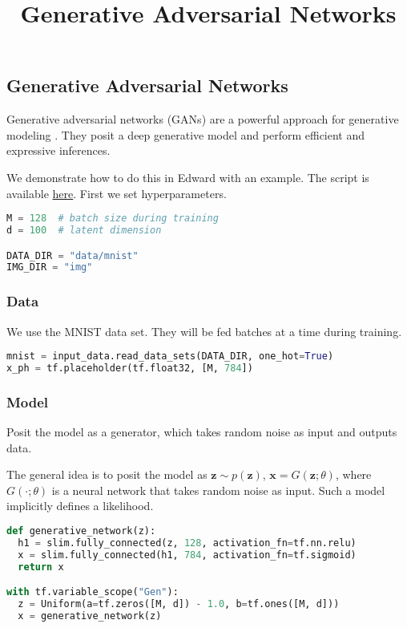 \title{Generative Adversarial Networks}

\subsection{Generative Adversarial Networks}

Generative adversarial networks (GANs) are a powerful approach for
generative modeling \citep{goodfellow2014generative,goodfellow2016nips}.
They posit a deep generative model and perform efficient and
expressive inferences.

We demonstrate how to do this in Edward with an example.
The script is available
\href{https://github.com/blei-lab/edward/blob/master/examples/gan.py}
{here}.
First we set hyperparameters.

\begin{lstlisting}[language=Python]
M = 128  # batch size during training
d = 100  # latent dimension

DATA_DIR = "data/mnist"
IMG_DIR = "img"
\end{lstlisting}


\subsubsection{Data}

We use the MNIST data set. They will be fed batches at a time during
training.

\begin{lstlisting}[language=Python]
mnist = input_data.read_data_sets(DATA_DIR, one_hot=True)
x_ph = tf.placeholder(tf.float32, [M, 784])
\end{lstlisting}


\subsubsection{Model}

Posit the model as a generator, which takes random noise as input and
outputs data.

The general idea is to posit the model as $\mathbf{z}\sim p(\mathbf{z})$,
$\mathbf{x}=G(\mathbf{z}; \theta)$, where $G(\cdot; \theta)$ is a neural
network that takes random noise as input. Such a model implicitly
defines a likelihood.

\begin{lstlisting}[language=Python]
def generative_network(z):
  h1 = slim.fully_connected(z, 128, activation_fn=tf.nn.relu)
  x = slim.fully_connected(h1, 784, activation_fn=tf.sigmoid)
  return x

with tf.variable_scope("Gen"):
  z = Uniform(a=tf.zeros([M, d]) - 1.0, b=tf.ones([M, d]))
  x = generative_network(z)
\end{lstlisting}


